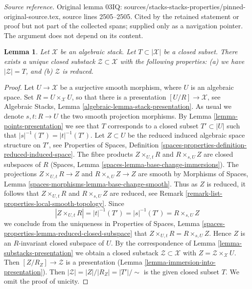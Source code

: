 \documentclass[10pt,a4paper]{amsart}
\theoremstyle{plain}
\newtheorem{lemma}[subsection]{Lemma}
\theoremstyle{definition}
\theoremstyle{remark}
\numberwithin{equation}{subsection}
\begin{document}
\noindent\textit{Source reference.} Original lemma 03IQ: sources/stacks-stacks-properties/pinned-original-source.tex, source lines 2505--2505. Cited by the retained statement or proof but not part of the collected spans; supplied only as a navigation pointer. The argument does not depend on its content.\par\medskip
\begin{lemma}
\label{lemma-reduced-closed-substack}
Let $\mathcal{X}$ be an algebraic stack.
Let $T \subset |\mathcal{X}|$ be a closed subset.
There exists a unique closed substack $\mathcal{Z} \subset \mathcal{X}$
with the following properties:
(a) we have $|\mathcal{Z}| = T$, and (b) $\mathcal{Z}$ is reduced.
\end{lemma}

\begin{proof}
Let $U \to \mathcal{X}$ be a surjective smooth morphism, where $U$ is an
algebraic space. Set $R = U \times_\mathcal{X} U$, so that there is a
presentation $[U/R] \to \mathcal{X}$, see
Algebraic Stacks, Lemma \ref{algebraic-lemma-stack-presentation}.
As usual we denote $s, t : R \to U$ the two smooth projection morphisms.
By Lemma \ref{lemma-points-presentation}
we see that $T$ corresponds to a closed subset $T' \subset |U|$ such
that $|s|^{-1}(T') = |t|^{-1}(T')$.
Let $Z \subset U$ be the reduced induced algebraic space
structure on $T'$, see
Properties of Spaces,
Definition \ref{spaces-properties-definition-reduced-induced-space}.
The fibre products
$Z \times_{U, t} R$ and $R \times_{s, U} Z$ are closed subspaces
of $R$
(Spaces, Lemma \ref{spaces-lemma-base-change-immersions}).
The projections $Z \times_{U, t} R \to Z$ and
$R \times_{s, U} Z \to Z$ are smooth by
Morphisms of Spaces, Lemma \ref{spaces-morphisms-lemma-base-change-smooth}.
Thus as $Z$ is reduced, it follows that
$Z \times_{U, t} R$ and $R \times_{s, U} Z$ are reduced, see
Remark \ref{remark-list-properties-local-smooth-topology}.
Since
$$
|Z \times_{U, t} R| = |t|^{-1}(T') = |s|^{-1}(T') = R \times_{s, U} Z
$$
we conclude from the uniqueness in
Properties of Spaces,
Lemma \ref{spaces-properties-lemma-reduced-closed-subspace}
that $Z \times_{U, t} R = R \times_{s, U} Z$.
Hence $Z$ is an $R$-invariant closed subspace of $U$.
By the correspondence of
Lemma \ref{lemma-substacks-presentation}
we obtain a closed substack $\mathcal{Z} \subset \mathcal{X}$
with $Z = \mathcal{Z} \times_\mathcal{X} U$. Then
$[Z/R_Z] \to \mathcal{Z}$ is a presentation
(Lemma \ref{lemma-immersion-into-presentation}).
Then $|\mathcal{Z}| = |Z|/|R_Z| = |T'|/\sim$ is the given
closed subset $T$. We omit the proof of unicity.
\end{proof}
\end{document}
